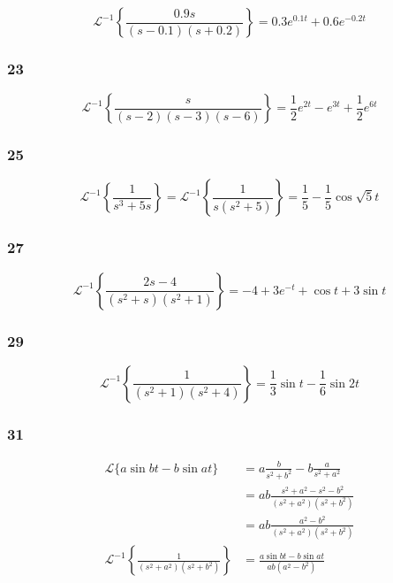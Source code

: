 \documentclass{article}
\begin{document}
\[\mathcal{L}^{-1} \left\{ \frac{0.9s}{(s - 0.1) (s + 0.2)} \right\} = 0.3 e^{0.1 t} + 0.6 e^{-0.2 t}\]

\subsubsection{23}

\[\mathcal{L}^{-1} \left\{ \frac{s}{(s - 2) (s - 3) (s - 6)} \right\} = \frac{1}{2} e^{2 t} - e^{3 t} + \frac{1}{2} e^{6 t}\]

\subsubsection{25}

\[\mathcal{L}^{-1} \left\{ \frac{1}{s^3 + 5s} \right\} = \mathcal{L}^{-1} \left\{ \frac{1}{s (s^2 + 5)} \right\} = \frac{1}{5} - \frac{1}{5} \cos \sqrt{5} t\]

\subsubsection{27}

\[\mathcal{L}^{-1} \left\{ \frac{2 s - 4}{(s^2 + s) (s^2 + 1)} \right\} = -4 + 3 e^{-t} + \cos t + 3 \sin t\]

\subsubsection{29}

\[\mathcal{L}^{-1} \left\{ \frac{1}{(s^2 + 1) (s^2 + 4)} \right\} = \frac{1}{3} \sin t - \frac{1}{6} \sin 2 t\]

\subsubsection{31}

\begin{align*}
  \mathcal{L}\{a \sin b t - b \sin a t\}                              & = a \frac{b}{s^2 + b^2} - b \frac{a}{s^2 + a^2}             \\
                                                                      & = a b \frac{s^2 + a^2 - s^2 - b^2}{(s^2 + a^2) (s^2 + b^2)} \\
                                                                      & = a b \frac{a^2 - b^2}{(s^2 + a^2) (s^2 + b^2)}             \\
  \mathcal{L}^{-1} \left\{ \frac{1}{(s^2 + a^2) (s^2 + b^2)} \right\} & = \frac{a \sin b t - b \sin a t}{a b (a^2 - b^2)}
\end{align*}
\end{document}

